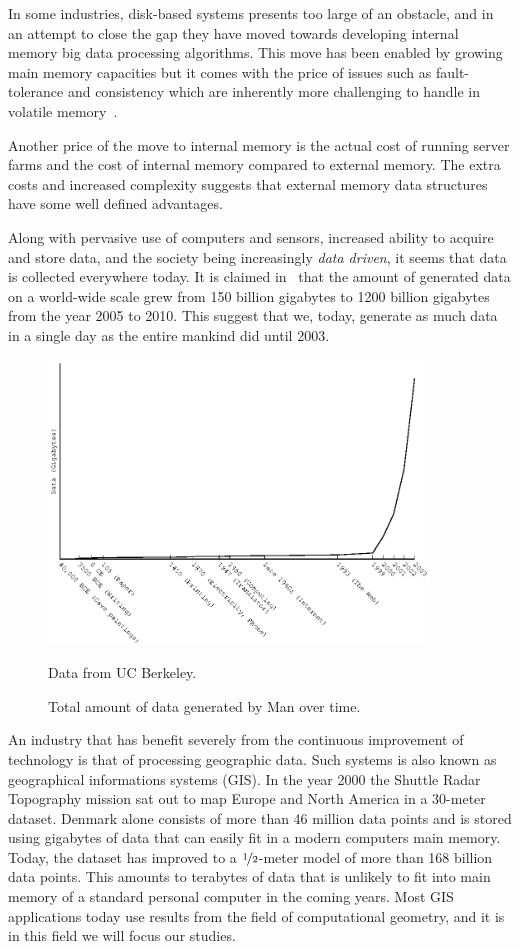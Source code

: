 \documentclass[twoside,11pt,openright]{report}
\begin{document}
In some industries, disk-based systems presents too large of an obstacle, and in an attempt to close the gap they have moved towards developing internal memory big data processing algorithms. This move has been enabled by growing main memory capacities but it comes with the price of issues such as fault-tolerance and consistency which are inherently more challenging to handle in volatile memory~\cite{Zhang2015}.

Another price of the move to internal memory is the actual cost of running server farms and the cost of internal memory compared to external memory. The extra costs and increased complexity suggests that external memory data structures have some well defined advantages.

Along with pervasive use of computers and sensors, increased ability to acquire and store data, and the society being increasingly \textit{data driven}, it seems that data is collected everywhere today. It is claimed in~\cite{economist:0210} that the amount of generated data on a world-wide scale grew from 150 billion gigabytes to 1200 billion gigabytes from the year 2005 to 2010. This suggest that we, today, generate as much data in a single day as the entire mankind did until 2003.

\begin{figure}[h]
	\centering
		\includegraphics[width=0.9\textwidth]{../plots/massive_data/massive_data}
	\caption{Total amount of data generated by Man over time.}
	\tiny{Data from UC Berkeley.}
	\label{fig:massive_data}
\end{figure}

An industry that has benefit severely from the continuous improvement of technology is that of processing geographic data. Such systems is also known as geographical informations systems (GIS). In the year 2000 the Shuttle Radar Topography mission sat out to map Europe and North America in a 30-meter dataset. Denmark alone consists of more than 46 million data points and is stored using gigabytes of data that can easily fit in a modern computers main memory. Today, the dataset has improved to a $\nicefrac{1}{2}$-meter model of more than 168 billion data points. This amounts to terabytes of data that is unlikely to fit into main memory of a standard personal computer in the coming years. Most GIS applications today use results from the field of computational geometry, and it is in this field we will focus our studies.
\end{document}
